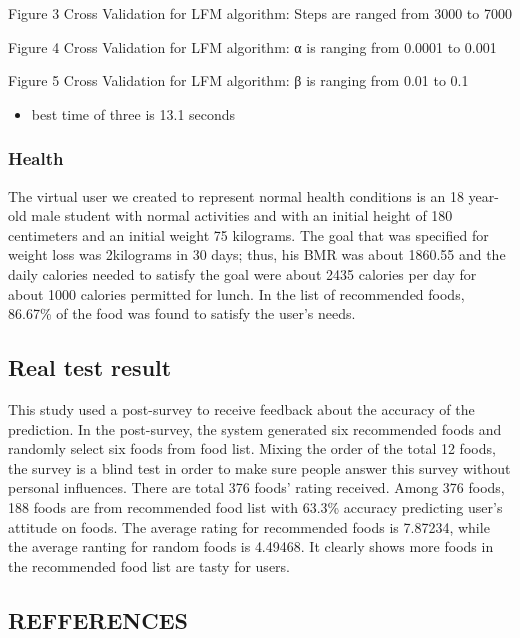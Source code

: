 \documentclass[11pt]{article}
\providecommand{\tightlist}{%
      \setlength{\itemsep}{0pt}\setlength{\parskip}{0pt}}
\begin{document}
     Figure 3 Cross Validation for LFM algorithm: Steps are ranged from 3000
to 7000

     Figure 4 Cross Validation for LFM algorithm: α is ranging from 0.0001
to 0.001

     Figure 5 Cross Validation for LFM algorithm: β is ranging from 0.01 to
0.1

    \begin{itemize}
\tightlist
\item
  best time of three is 13.1 seconds
\end{itemize}

    \subsubsection{Health}\label{health}

    The virtual user we created to represent normal health conditions is an
18 year-old male student with normal activities and with an initial
height of 180 centimeters and an initial weight 75 kilograms. The goal
that was specified for weight loss was 2kilograms in 30 days; thus, his
BMR was about 1860.55 and the daily calories needed to satisfy the goal
were about 2435 calories per day for about 1000 calories permitted for
lunch. In the list of recommended foods, 86.67\% of the food was found
to satisfy the user's needs.

    \subsection{Real test result}\label{real-test-result}

    This study used a post-survey to receive feedback about the accuracy of
the prediction. In the post-survey, the system generated six recommended
foods and randomly select six foods from food list. Mixing the order of
the total 12 foods, the survey is a blind test in order to make sure
people answer this survey without personal influences. There are total
376 foods' rating received. Among 376 foods, 188 foods are from
recommended food list with 63.3\% accuracy predicting user's attitude on
foods. The average rating for recommended foods is {7.87234}, while the
average ranting for random foods is {4.49468}. It clearly shows more
foods in the recommended food list are tasty for users.

    \subsection{REFFERENCES}\label{refferences}
\end{document}
